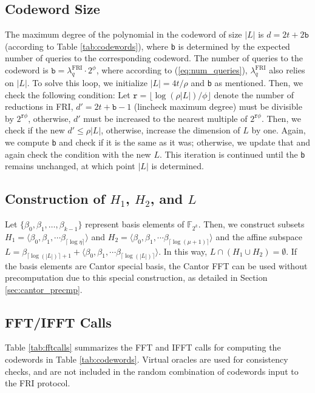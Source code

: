 \subsection{Codeword Size}
The maximum degree of the polynomial in the codeword of size $|L|$ is $d = 2t+2\texttt{b}$ (according to Table \ref{tab:codewords}), where \texttt{b} is determined by the expected number of queries to the corresponding codeword.
The number of queries to the codeword is $\texttt{b} = \lambda_q^\text{FRI} \cdot 2^{\phi}$, where according to (\ref{eq:num_queries}), $\lambda_q^\text{FRI}$ also relies on $|L|$. To solve this loop, we initialize $|L| = 4t/\rho$ and \texttt{b} as mentioned. Then, we check the following condition: Let $\texttt{r}=\lfloor\log(\rho|L|)/\phi\rfloor$ denote the number of reductions in FRI,  $d' = 2t + \texttt{b}-1$ (lincheck maximum degree) must be divisible by $2^{\texttt{r}\phi}$, otherwise, $d'$ must be increased to the nearest multiple of $2^{\texttt{r}\phi}$. Then, we check if the new $d' \leq \rho |L|$, otherwise, increase the dimension of $L$ by one. Again, we compute \texttt{b} and check if it is the same as it was; otherwise, we update that and again check the condition with the new $L$. This iteration is continued until the \texttt{b} remains unchanged, at which point $|L|$ is determined.

\subsection{Construction of $H_1$, $H_2$, and $L$}
Let $\{\beta_0, \beta_1, \dots, \beta_{k-1}\}$ represent basis elements of $\mathbb{F}_{2^k}$. Then, we construct subsets  $H_1=\langle \beta_0, \beta_1, \cdots \beta_{\lceil\log\eta\rceil} \rangle$ and $H_2 = \langle \beta_0, \beta_1, \cdots \beta_{
	\lceil\log(\mu + 1)\rceil} \rangle$ and the affine subspace $L= \beta_{
	\lceil\log(|L|)\rceil+1} + \langle \beta_0, \beta_1, \cdots \beta_{
	\lceil\log(|L|)\rceil} \rangle$. In this way,  $L \cap (H_1 \cup H_2) = \emptyset$. If the basis elements are Cantor special basis, the Cantor FFT can be used without precomputation due to this special construction, as detailed in Section \ref{sec:cantor_precmp}.

\subsection{FFT/IFFT Calls}
Table \ref{tab:fftcalls} summarizes the FFT and IFFT calls for computing the codewords in Table \ref{tab:codewords}. Virtual oracles are used for consistency checks, and are not included in the random combination of codewords input to the FRI protocol.

